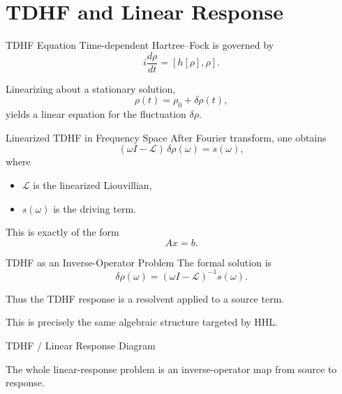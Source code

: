 \documentclass{beamer}
\begin{document}
\section{TDHF and Linear Response}

\begin{frame}{TDHF Equation}
Time-dependent Hartree--Fock is governed by
\[
i \frac{d\rho}{dt} = [h[\rho],\rho].
\]

Linearizing about a stationary solution,
\[
\rho(t)=\rho_0+\delta\rho(t),
\]
yields a linear equation for the fluctuation \(\delta\rho\).
\end{frame}


\begin{frame}{Linearized TDHF in Frequency Space}
After Fourier transform, one obtains
\[
(\omega I-\mathcal{L})\,\delta\rho(\omega)=s(\omega),
\]
where
\begin{itemize}
\item \(\mathcal{L}\) is the linearized Liouvillian,
\item \(s(\omega)\) is the driving term.
\end{itemize}

This is exactly of the form
\[
Ax=b.
\]
\end{frame}


\begin{frame}{TDHF as an Inverse-Operator Problem}
The formal solution is
\[
\delta\rho(\omega)=
(\omega I-\mathcal{L})^{-1}s(\omega).
\]

Thus the TDHF response is a resolvent applied to a source term.

This is precisely the same algebraic structure targeted by HHL.
\end{frame}


\begin{frame}{TDHF / Linear Response Diagram}
\centering
{}

\vspace{0.4cm}
The whole linear-response problem is an inverse-operator map from source to response.
\end{frame}
\end{document}
